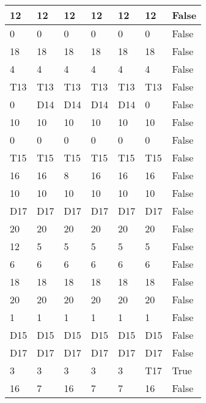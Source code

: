 \begin{longtable}[htbp]{| p{} | p{} | p{}| p{}| p{}| p{}| p{}|}
12 & 12 & 12 & 12 & 12 & 12 & False \\ \hline
0 & 0 & 0 & 0 & 0 & 0 & False \\ \hline
18 & 18 & 18 & 18 & 18 & 18 & False \\ \hline
4 & 4 & 4 & 4 & 4 & 4 & False \\ \hline
\multicolumn{1}{|l|}{T13} & \multicolumn{1}{l|}{T13} & \multicolumn{1}{l|}{T13} & \multicolumn{1}{l|}{T13} & \multicolumn{1}{l|}{T13} & \multicolumn{1}{l|}{T13} & False \\ \hline
0 & \multicolumn{1}{l|}{D14} & \multicolumn{1}{l|}{D14} & \multicolumn{1}{l|}{D14} & \multicolumn{1}{l|}{D14} & 0 & False \\ \hline
10 & 10 & 10 & 10 & 10 & 10 & False \\ \hline
0 & 0 & 0 & 0 & 0 & 0 & False \\ \hline
\multicolumn{1}{|l|}{T15} & \multicolumn{1}{l|}{T15} & \multicolumn{1}{l|}{T15} & \multicolumn{1}{l|}{T15} & \multicolumn{1}{l|}{T15} & \multicolumn{1}{l|}{T15} & False \\ \hline
16 & 16 & 8 & 16 & 16 & 16 & False \\ \hline
10 & 10 & 10 & 10 & 10 & 10 & False \\ \hline
\multicolumn{1}{|l|}{D17} & \multicolumn{1}{l|}{D17} & \multicolumn{1}{l|}{D17} & \multicolumn{1}{l|}{D17} & \multicolumn{1}{l|}{D17} & \multicolumn{1}{l|}{D17} & False \\ \hline
20 & 20 & 20 & 20 & 20 & 20 & False \\ \hline
12 & 5 & 5 & 5 & 5 & 5 & False \\ \hline
6 & 6 & 6 & 6 & 6 & 6 & False \\ \hline
18 & 18 & 18 & 18 & 18 & 18 & False \\ \hline
20 & 20 & 20 & 20 & 20 & 20 & False \\ \hline
1 & 1 & 1 & 1 & 1 & 1 & False \\ \hline
\multicolumn{1}{|l|}{D15} & \multicolumn{1}{l|}{D15} & \multicolumn{1}{l|}{D15} & \multicolumn{1}{l|}{D15} & \multicolumn{1}{l|}{D15} & \multicolumn{1}{l|}{D15} & False \\ \hline
\multicolumn{1}{|l|}{D17} & \multicolumn{1}{l|}{D17} & \multicolumn{1}{l|}{D17} & \multicolumn{1}{l|}{D17} & \multicolumn{1}{l|}{D17} & \multicolumn{1}{l|}{D17} & False \\ \hline
3 & 3 & 3 & 3 & 3 & \multicolumn{1}{l|}{T17} & True \\ \hline
16 & 7 & 16 & 7 & 7 & 16 & False \\ \hline

\end{longtable}

